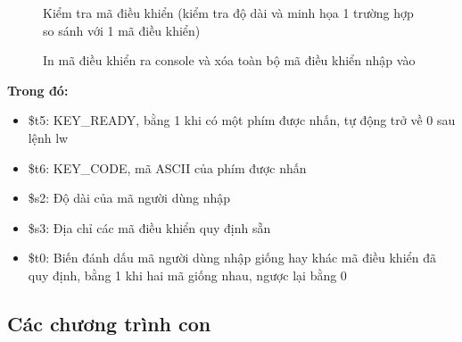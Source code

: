 \documentclass[a4paper,12pt]{article}
\begin{document}
        \FloatBarrier
        \begin{figure}[ht!]
    	    \centerline{}
    	    \caption{Kiểm tra mã điều khiển (kiểm tra độ dài và minh họa 1 trường hợp so sánh với 1 mã điều khiển)}
    	    \label{fig:bai100}
        \end{figure}
        \FloatBarrier
        \begin{figure}[ht!]
    	    \centerline{}
    	    \caption{In mã điều khiển ra console và xóa toàn bộ mã điều khiển nhập vào}
    	    \label{fig:bai100}
        \end{figure}
    	\clearpage
    	\noindent
    	\textbf{Trong đó:}
    	\begin{itemize}
    	    \item \$t5: KEY\_READY, bằng 1 khi có một phím được nhấn, tự động trở về 0 sau lệnh lw
    	    \item \$t6: KEY\_CODE, mã ASCII của phím được nhấn
    	    \item \$s2: Độ dài của mã người dùng nhập
    	    \item \$s3: Địa chỉ các mã điều khiển quy định sẵn
    	    \item \$t0: Biến đánh dấu mã người dùng nhập giống hay khác mã điều khiển đã quy định, bằng 1 khi hai mã giống nhau, ngược lại bằng 0
    	\end{itemize}
    	
    \clearpage
	\subsection{Các chương trình con}
\end{document}
